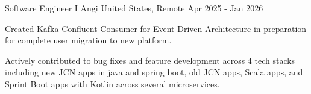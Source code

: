   \cventry
    {Software Engineer I} %
    {Angi} %
    {United States, Remote} %
    {Apr 2025 - Jan 2026} %
    {
        \begin{cvitems}
            \item{Created Kafka Confluent Consumer for Event Driven Architecture in preparation for complete user migration to new platform.}
            \item{Actively contributed to bug fixes and feature development across 4 tech stacks including new JCN apps in java and spring boot, old JCN apps, Scala apps, and Sprint Boot apps with Kotlin across several microservices.}
        \end{cvitems}
    }
